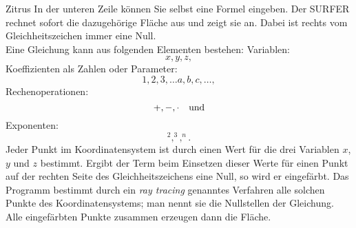 \begin{surferPage}{Zitrus}
In der unteren Zeile können Sie selbst eine Formel eingeben. Der SURFER rechnet sofort die dazugehörige Fläche aus und zeigt sie an. Dabei ist rechts vom Gleichheitszeichen immer eine Null. \\
Eine Gleichung kann aus folgenden Elementen bestehen:
\newline
Variablen:
\[x, y, z, \]
Koeffizienten als Zahlen oder Parameter:
\[1, 2, 3, \dots a, b, c, \dots, \]
Rechenoperationen:
\[+,  - , \cdot \quad \textnormal{und} \]
Exponenten:
\[ ^2, ^3, ^n .\]
Jeder Punkt im Koordinatensystem ist durch einen Wert für die drei Variablen $x$, $y$ und $z$ bestimmt. Ergibt der Term beim Einsetzen dieser Werte f\"ur einen Punkt auf der rechten Seite des Gleichheitszeichens eine Null, so wird er eingefärbt. Das Programm bestimmt durch ein \textit{ray tracing} genanntes Verfahren alle solchen Punkte des Koordinatensystems; man nennt sie die Nullstellen der Gleichung. Alle eingef\"arbten Punkte zusammen erzeugen dann die Fl\"ache.
\end{surferPage}
